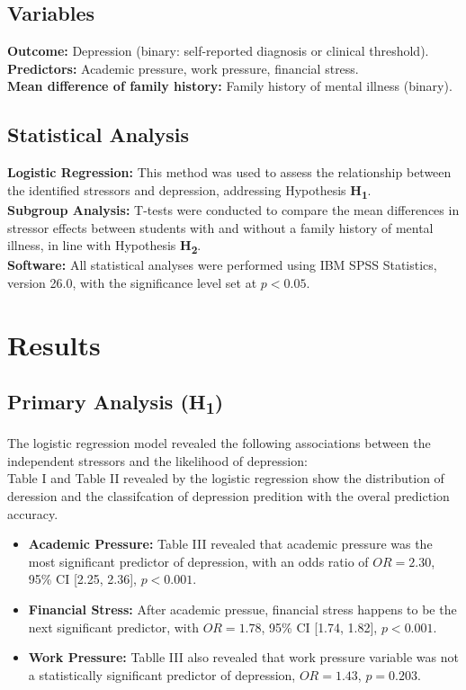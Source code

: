 \documentclass[conference]{IEEEtran}
\begin{document}
\subsection{Variables}
\textbf{Outcome:} Depression (binary: self-reported diagnosis or clinical threshold).\\
\textbf{Predictors:} Academic pressure, work pressure, financial stress.\\
\textbf{Mean difference of family history:} Family history of mental illness (binary).

\subsection{Statistical Analysis}
\textbf{Logistic Regression:} This method was used to assess the relationship between the identified stressors and depression, addressing Hypothesis \textbf{H\textsubscript{1}}.\\
\textbf{Subgroup Analysis:} T-tests were conducted to compare the mean differences in stressor effects between students with and without a family history of mental illness, in line with Hypothesis \textbf{H\textsubscript{2}}.\\
\textbf{Software:} All statistical analyses were performed using IBM SPSS Statistics, version 26.0, with the significance level set at $p < 0.05$.

\section{Results}

\subsection{Primary Analysis (H\textsubscript{1})}
The logistic regression model revealed the following associations between the independent stressors and the likelihood of depression: \\
Table I and Table II revealed by the logistic regression show the distribution of deression and the classifcation of depression predition with the overal prediction accuracy.

\begin{itemize}
    \item \textbf{Academic Pressure:} Table III revealed that academic pressure was the most significant predictor of depression, with an odds ratio of $OR = 2.30$, 95\% CI [2.25, 2.36], $p < 0.001$.
    \item \textbf{Financial Stress:} After academic pressue, financial stress happens to be the next significant predictor, with $OR = 1.78$, 95\% CI [1.74, 1.82], $p < 0.001$.
    \item \textbf{Work Pressure:} Tablle III also revealed that work pressure variable was not a statistically significant predictor of depression, $OR = 1.43$, $p = 0.203$.
\end{itemize}
\end{document}
